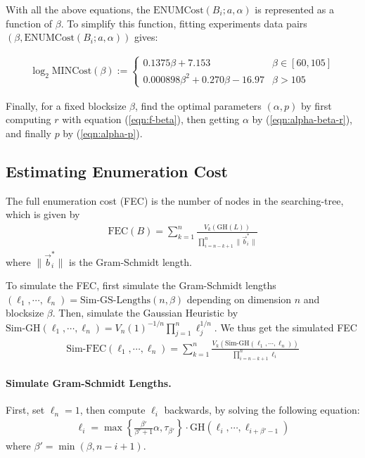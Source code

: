 \documentclass[11pt]{article}
\newcommand{\vb}{\vec{b}}
\newcommand{\GH}{\mathrm{GH}}
\newcommand{\ENUMCost}{\mathrm{ENUMCost}}
\newcommand{\MINCost}{\mathrm{MINCost}}
\newcommand{\SimGSLengths}{\mathrm{Sim}\text{-}\mathrm{GS}\text{-}\mathrm{Lengths}}
\newcommand{\SimFEC}{\mathrm{Sim}\text{-}\mathrm{FEC}}
\newcommand{\SimGH}{\mathrm{Sim}\text{-}\mathrm{GH}}
\begin{document}
With all the above equations, the $\ENUMCost(B_i;a,\alpha)$ is represented as a function of $\beta$.
To simplify this function, fitting experiments data pairs $(\beta,\ENUMCost(B_i;a,\alpha))$ gives:

\begin{eqnarray}
\log_2\MINCost(\beta):=\left\{\begin{matrix} 0.1375\beta + 7.153 & \beta\in[60,105] \\
0.000898\beta^2 + 0.270\beta - 16.97 & \beta>105 \end{matrix}\right.
\end{eqnarray}

Finally, for a fixed blocksize $\beta$, find the optimal parameters $(\alpha,p)$ by first computing $r$ with equation (\ref{eqn:f-beta}), then getting $\alpha$ by (\ref{eqn:alpha-beta-r}), and finally $p$ by (\ref{eqn:alpha-p}).

\subsection{Estimating Enumeration Cost}

The full enumeration cost (FEC) is the number of nodes in the searching-tree, which is given by
\begin{eqnarray}
\mathrm{FEC}(B)=\sum_{k=1}^n\frac{V_k(\GH(L))}{\prod_{i=n-k+1}^n\|\vb_i^*\|}
\end{eqnarray}
where $\|\vb_i^*\|$ is the Gram-Schmidt length.

To simulate the FEC, first simulate the Gram-Schmidt lengths $(\ell_1,\cdots,\ell_n)=\SimGSLengths(n,\beta)$ depending on dimension $n$ and blocksize $\beta$.
Then, simulate the Gaussian Heuristic by $\SimGH(\ell_1,\cdots,\ell_n)=V_n(1)^{-1/n}\prod_{j=1}^n\ell_j^{1/n}$.
We thus get the simulated FEC
\begin{eqnarray}
\SimFEC(\ell_1,\cdots,\ell_n)=\sum_{k=1}^n\frac{V_k(\SimGH(\ell_1,\cdots,\ell_n))}{\prod_{i=n-k+1}^n\ell_i}
\end{eqnarray}

\paragraph{Simulate Gram-Schmidt Lengths.}

First, set $\ell_n=1$, then compute $\ell_i$ backwards, by solving the following equation:
\begin{eqnarray}
\ell_i=\max\left\{\frac{\beta'}{\beta'+1}\alpha,\tau_{\beta'}\right\}\cdot\GH(\ell_i,\cdots,\ell_{i+\beta'-1}) \label{eqn:sim-gs}
\end{eqnarray}
where $\beta'=\min(\beta,n-i+1)$.
\end{document}
